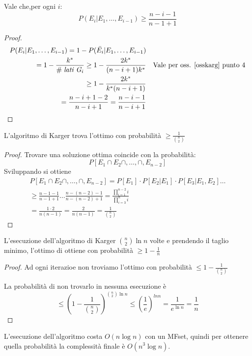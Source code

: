 \begin{lemma}
    Vale che,per ogni $i$: $$P(E_i | E_1, \dots, E_{i-1}) \geq \frac{n-i-1}{n-1+1}$$
\end{lemma}
\begin{proof}
    \begin{equation}
        \begin{aligned}
            P(E_i | E_1, \dots, E_{i-1}) = 1- P(\bar{E_i} | E_1, \dots, E_{i-1})\\
            = 1 - \frac{k^*}{\mathit{\#\;lati\;G_i}} \geq 1 - \frac{2k^*}{(n-i+1)k^*} && \text{Vale per oss. \ref{osskarg} punto 4}\\
            \geq 1 - \frac{2k^*}{k^*(n-i+1)} \\
            = \frac{n-i+1-2}{n-i+1} = \frac{n-i-1}{n-i+1}
        \end{aligned}
    \end{equation}
\end{proof}
\begin{theorem}
    L'algoritmo di Karger trova l'ottimo con probabilità $\geq \frac{1}{\binom{n}{2}}$
\end{theorem}
\begin{proof}
    Trovare una soluzione ottima coincide con la probabilità:
    $$P[E_1 \cap E_2 \cap, \dots, \cap, E_{n-2}]$$
    Sviluppando si ottiene 
    \begin{equation}
        \begin{aligned}
            P[E_1 \cap E_2 \cap, \dots, \cap, E_{n-2}] = P[E_1]\cdot P[E_2 | E_1]\cdot P[E_3 | E_1,E_2] \dots\\
            \geq \frac{n-1-1}{n-1+1} \dots \frac{n - (n-2)-1}{n - (n-2)+1} = \frac{\prod_{i=1}^{n-2}i}{\prod_{i=3}^{n}i}\\
            = \frac{1 \cdot 2}{n(n-1)} = \frac{2}{n(n-1)} = \frac{1}{\binom{n}{2}}
        \end{aligned}
    \end{equation}

\end{proof}
\begin{corollary}
    L'esecuzione dell'algoritmo di Karger $\binom{n}{2}\ln n$ volte e prendendo il taglio minimo, 
    l'ottimo di ottiene con probabilità $\geq 1 - \frac{1}{n}$
\end{corollary}
\begin{proof}
    Ad ogni iterazioe non troviamo l'ottimo con probabilità $\leq 1 - \frac{1}{\binom{n}{2}}$

    La probabilità di non trovarlo in nessuna esecuzione è 
    $$\leq (1 - \frac{1}{\binom{n}{2}}) ^{\binom{n}{2}\ln n} \leq (\frac{1}{e})^{ln n} = \frac{1}{e ^{\ln n}} = \frac{1}{n}$$
\end{proof}
\begin{remark}
    L'esecuzione dell'algoritmo costa $O(n\log n)$ con un MFset, quindi per ottenere quella probabilità 
    la complessità finale è $O(n^3 \log n)$.
\end{remark}

